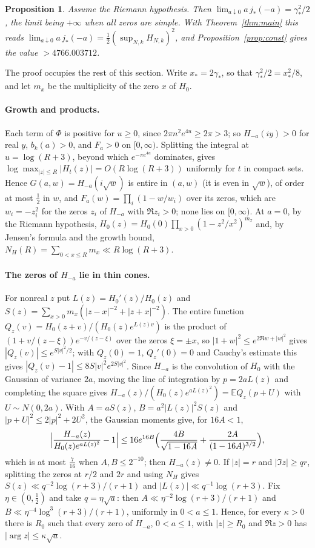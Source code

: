\documentclass[11pt,a4paper]{article}
\theoremstyle{plain}
\newtheorem{proposition}[theorem]{Proposition}
\theoremstyle{remark}
\begin{document}
\begin{proposition}\label{prop:heat}
Assume the Riemann hypothesis. Then $\lim_{a\downarrow0}a\,j_*(-a)=\gamma_*^2/2$, the limit being $+\infty$ when all
zeros are simple. With Theorem~\ref{thm:main} this reads
$\lim_{a\downarrow0}a\,j_*(-a)=\frac12(\sup_{N,k}H_{N,k})^2$, and Proposition~\ref{prop:const} gives the value
$>4766.003712$.
\end{proposition}

The proof occupies the rest of this section. Write $x_*=2\gamma_*$, so that $\gamma_*^2/2=x_*^2/8$, and let
$m_x$ be the multiplicity of the zero $x$ of $H_0$.

\paragraph{Growth and products.}
Each term of $\Phi$ is positive for $u\ge0$, since $2\pi n^2e^{4u}\ge2\pi>3$; so $H_{-a}(iy)>0$ for real $y$, $b_k(a)>0$,
and $F_a>0$ on $[0,\infty)$. Splitting the integral at $u=\log(R+3)$, beyond which $e^{-\pi e^{4u}}$ dominates,
gives $\log\max_{|z|\le R}|H_t(z)|=O(R\log(R+3))$ uniformly for $t$ in compact sets. Hence $G(a,w)=H_{-a}(i\sqrt w)$ is
entire in $(a,w)$ (it is even in $\sqrt w$), of order at most $\frac12$ in $w$, and $F_a(w)=\prod_i(1-w/w_i)$ over its
zeros, which are $w_i=-z_i^2$ for the zeros $z_i$ of $H_{-a}$ with $\Re z_i>0$; none lies on $[0,\infty)$. At $a=0$,
by the Riemann hypothesis, $H_0(z)=H_0(0)\prod_{x>0}(1-z^2/x^2)^{m_x}$ and, by Jensen's formula and the growth bound,
$N_H(R)=\sum_{0<x\le R}m_x\ll R\log(R+3)$.

\paragraph{The zeros of $H_{-a}$ lie in thin cones.}
For nonreal $z$ put $L(z)=H_0'(z)/H_0(z)$ and $S(z)=\sum_{x>0}m_x(|z-x|^{-2}+|z+x|^{-2})$. The entire function
$Q_z(v)=H_0(z+v)/(H_0(z)e^{L(z)v})$ is the product of $(1+v/(z-\xi))e^{-v/(z-\xi)}$ over the zeros $\xi=\pm x$, so
$|1+w|^2\le e^{2\Re w+|w|^2}$ gives $|Q_z(v)|\le e^{S|v|^2/2}$; with $Q_z(0)=1$, $Q_z'(0)=0$ and Cauchy's estimate this gives
$|Q_z(v)-1|\le8S|v|^2e^{2S|v|^2}$. Since $H_{-a}$ is the convolution of $H_0$ with the Gaussian of variance $2a$, moving the
line of integration by $p=2aL(z)$ and completing the square gives
$H_{-a}(z)/(H_0(z)e^{aL(z)^2})=\mathbb EQ_z(p+U)$ with $U\sim N(0,2a)$. With $A=aS(z)$, $B=a^2|L(z)|^2S(z)$ and
$|p+U|^2\le2|p|^2+2U^2$, the Gaussian moments give, for $16A<1$,
\[
 \Bigl|\frac{H_{-a}(z)}{H_0(z)e^{aL(z)^2}}-1\Bigr|\le16e^{16B}\Bigl(\frac{4B}{\sqrt{1-16A}}+\frac{2A}{(1-16A)^{3/2}}\Bigr),
\]
which is at most $\frac7{16}$ when $A,B\le2^{-10}$; then $H_{-a}(z)\ne0$. If $|z|=r$ and $|\Im z|\ge q r$, splitting the
zeros at $r/2$ and $2r$ and using $N_H$ gives $S(z)\ll q^{-2}\log(r+3)/(r+1)$ and $|L(z)|\ll q^{-1}\log(r+3)$. Fix
$\eta\in(0,\frac12)$ and take $q=\eta\sqrt a$: then $A\ll\eta^{-2}\log(r+3)/(r+1)$ and
$B\ll\eta^{-4}\log^3(r+3)/(r+1)$, uniformly in $0<a\le1$. Hence, for every $\kappa>0$ there is $R_0$ such that every
zero of $H_{-a}$, $0<a\le1$, with $|z|\ge R_0$ and $\Re z>0$ has $|\arg z|\le\kappa\sqrt a$.
\end{document}
